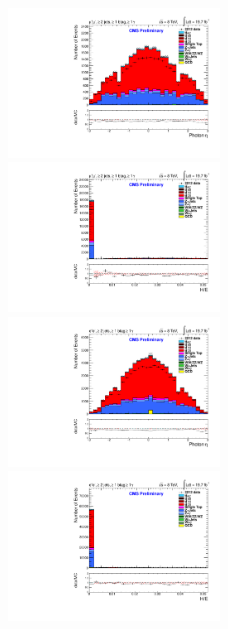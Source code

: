 \documentclass[oneside, a4paper, 11pt, ]{report}
\begin{document}
\begin{figure}
\includegraphics[width=0.5\textwidth]{Plots/ControlPlots/TTbarDiLeptonAnalysis/MuMu/Photons/AllPhotons/Photon_Eta_splitTTbar_ratio.pdf}
\includegraphics[width=0.5\textwidth]{Plots/ControlPlots/TTbarDiLeptonAnalysis/MuMu/Photons/AllPhotons/Photon_HtowoE_splitTTbar_ratio.pdf}\\
\includegraphics[width=0.5\textwidth]{Plots/ControlPlots/TTbarDiLeptonAnalysis/EE/Photons/AllPhotons/Photon_Eta_splitTTbar_ratio.pdf}
\includegraphics[width=0.5\textwidth]{Plots/ControlPlots/TTbarDiLeptonAnalysis/EE/Photons/AllPhotons/Photon_HtowoE_splitTTbar_ratio.pdf}\\

\end{figure}
\end{document}
